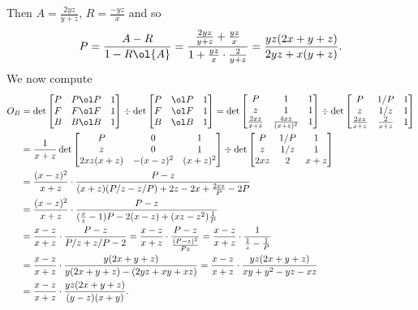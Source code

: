 Then $A = \frac{2yz}{y+z}$,
$R = \frac{-yz}{x}$ and so
\[ P = \frac{A-R}{1-R\ol{A}}
  = \frac{\frac{2yz}{y+z} + \frac{yz}{x}}
  {1 + \frac{yz}{x} \cdot \frac{2}{y+z}}
  = \frac{yz(2x+y+z)}{2yz+x(y+z)}. \]
We now compute
\begin{align*}
  O_B &= \det \begin{bmatrix}
    P & P \ol P & 1 \\
    F & F \ol F & 1 \\
    B & B \ol B & 1
  \end{bmatrix}
  \div \det \begin{bmatrix}
    P & \ol P & 1 \\
    F & \ol F & 1 \\
    B & \ol B & 1
  \end{bmatrix}
  = \det \begin{bmatrix}
    P & 1 & 1 \\
    z & 1 & 1 \\
    \frac{2xz}{x+z} & \frac{4xz}{(x+z)^2} & 1
  \end{bmatrix}
  \div \det \begin{bmatrix}
    P & 1/P & 1 \\
    z & 1/z & 1 \\
    \frac{2xz}{x+z} & \frac{2}{x+z} & 1
  \end{bmatrix} \\
  &= \frac{1}{x+z} \det \begin{bmatrix}
    P & 0 & 1 \\
    z & 0 & 1 \\
    2xz(x+z) & -(x-z)^2 & (x+z)^2
  \end{bmatrix}
  \div \det \begin{bmatrix}
    P & 1/P & 1 \\
    z & 1/z & 1 \\
    2xz & 2 & x+z
  \end{bmatrix} \\
  &= \frac{(x-z)^2}{x+z} \cdot \frac{P-z}{(x+z)(P/z-z/P)+2z-2x + \frac{2xz}{P}-2P} \\
  &= \frac{(x-z)^2}{x+z} \cdot \frac{P-z}{
    (\frac xz-1) P - 2(x-z) + (xz-z^2) \frac 1P  } \\
  &= \frac{x-z}{x+z} \cdot \frac{P-z}{P/z + z/P - 2}
  = \frac{x-z}{x+z} \cdot \frac{P-z}{\frac{(P-z)^2}{Pz}}
  = \frac{x-z}{x+z} \cdot \frac{1}{\frac 1z - \frac 1P} \\
  &= \frac{x-z}{x+z} \cdot \frac{y(2x+y+z)}{y(2x+y+z) - (2yz+xy+xz)}
  = \frac{x-z}{x+z} \cdot \frac{yz(2x+y+z)}{xy+y^2-yz-xz} \\
  &= \frac{x-z}{x+z} \cdot \frac{yz(2x+y+z)}{(y-z)(x+y)}.
\end{align*}
